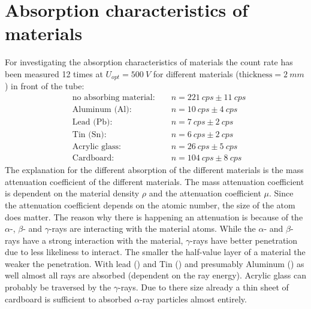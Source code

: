\section{Absorption characteristics of materials}
%
For investigating the absorption characteristics of materials the count rate has been measured 12 times at
\(U_{opt}=\SI{500}{V}\) for different materials (\(\text{thickness}=\SI{2}{mm}\)) in front of the tube:
%
\begin{align}
    &\text{no absorbing material: }  &&n = \SI{221}{cps} \pm \SI{11}{cps}\\
    &\text{Aluminum (Al): }          &&n = \SI{10}{cps} \pm \SI{4}{cps}\\
    &\text{Lead (Pb): }              &&n = \SI{7}{cps} \pm \SI{2}{cps}\\
    &\text{Tin (Sn): }               &&n = \SI{6}{cps} \pm \SI{2}{cps}\\
    &\text{Acrylic glass: }          &&n = \SI{26}{cps} \pm \SI{5}{cps}\\
    &\text{Cardboard: }              &&n = \SI{104}{cps} \pm \SI{8}{cps}
\end{align}
%
The explanation for the different absorption of the different materials is the mass attenuation coefficient of the
different materials. The mass attenuation coefficient is dependent on the material density \(\rho\) and the attenuation
coefficient \( \mu \). Since the attenuation coefficient depends on the atomic number, the size of the atom does
matter. The reason why there is happening an attenuation is because of the \(\alpha\)-, \(\beta\)- and \(\gamma\)-rays are
interacting with the material atoms. While the \(\alpha\)- and \(\beta\)-rays have a strong interaction with the material,
\(\gamma\)-rays have better penetration due to less likeliness to interact. The smaller the half-value layer of a
material the weaker the penetration. With lead () and Tin () and presumably Aluminum
() as well almost all rays are absorbed (dependent on the ray energy). Acrylic glass can probably be
traversed by the \(\gamma\)-rays. Due to there size already a thin sheet of cardboard is sufficient to absorbed
\(\alpha\)-ray particles almost entirely.
%
